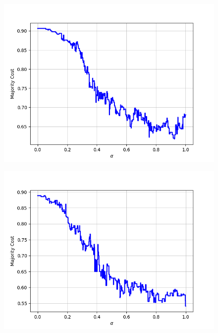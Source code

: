 \begin{figure}[H]
\begin{minipage}{.24\textwidth}
  {\includegraphics[width=\linewidth]{plots/omniglot-intra-sc-cnn/Sanskrit}}
\end{minipage}
\begin{minipage}{.24\textwidth}
  \centering
  {\includegraphics[width=\linewidth]{plots/omniglot-intra-sc-cnn/Syriac_(Estrangelo)}}
\end{minipage}
\begin{minipage}{.24\textwidth}
  \centering

\end{minipage}
\end{figure}
